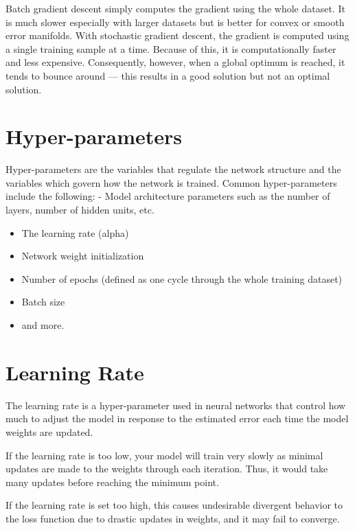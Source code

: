 \documentclass[
]{book}
\begin{document}
Batch gradient descent simply computes the gradient using the whole dataset. It is much slower especially with larger datasets but is better for convex or smooth error manifolds.
With stochastic gradient descent, the gradient is computed using a single training sample at a time. Because of this, it is computationally faster and less expensive. Consequently, however, when a global optimum is reached, it tends to bounce around --- this results in a good solution but not an optimal solution.

\hypertarget{hyper-parameters}{%
\section{Hyper-parameters}\label{hyper-parameters}}

Hyper-parameters are the variables that regulate the network structure and the variables which govern how the network is trained. Common hyper-parameters include the following:
- Model architecture parameters such as the number of layers, number of hidden units, etc.

\begin{itemize}
\item
  The learning rate (alpha)
\item
  Network weight initialization
\item
  Number of epochs (defined as one cycle through the whole training dataset)
\item
  Batch size
\item
  and more.
\end{itemize}

\hypertarget{learning-rate}{%
\section{Learning Rate}\label{learning-rate}}

The learning rate is a hyper-parameter used in neural networks that control how much to adjust the model in response to the estimated error each time the model weights are updated.

If the learning rate is too low, your model will train very slowly as minimal updates are made to the weights through each iteration. Thus, it would take many updates before reaching the minimum point.

If the learning rate is set too high, this causes undesirable divergent behavior to the loss function due to drastic updates in weights, and it may fail to converge.
\end{document}
